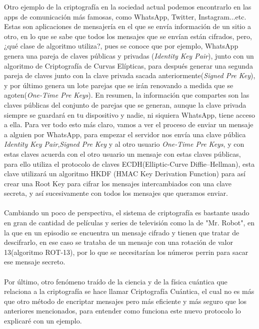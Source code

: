 \documentclass[12pt,a4paper]{book}
\theoremstyle{change}
\begin{document}
	Otro ejemplo de la criptografía en la sociedad actual podemos encontrarlo en las apps de comunicación más famosas, como WhatsApp, Twitter, Instagram...etc. Estas son aplicaciones de mensajería en el que se envía información de un sitio a otro, en lo que se sabe que todos los mensajes que se envían están cifrados, pero, ¿qué clase de algoritmo utiliza?, pues se conoce que por ejemplo, WhatsApp genera una pareja de claves públicas y privadas (\textit{Identity Key Pair}), junto con un algoritmo de Criptografía de Curvas Elípticas, para después generar una segunda pareja de claves junto con la clave privada sacada anteriormente(\textit{Signed Pre Key}), y por último genera un lote parejas que se irán renovando a medida que se agoten(\textit{One-Time Pre Keys}). En resumen, la información que compartes son las claves públicas del conjunto de parejas que se generan, aunque la clave privada siempre se guardará en tu dispositivo y nadie, ni siquiera WhatsApp, tiene acceso a ella. Para ver todo esto más claro, vamos a ver el proceso de enviar un mensaje a alguien por WhatsApp, para empezar el servidor nos envía una clave pública \textit{Identity Key Pair},\textit{Signed Pre Key} y al otro usuario \textit{One-Time Pre Keys}, y con estas claves acuerda con el otro usuario un mensaje con estas claves públicas, para ello utiliza el protocolo de claves ECDH(Elliptic-Curve Diffie–Hellman), esta clave utilizará un algoritmo HKDF (HMAC Key Derivation Function) para así crear una Root Key para cifrar los mensajes intercambiados con una clave secreta, y así sucesivamente con todos los mensajes que queramos enviar.\\
	\vspace{5mm}\\ %
	Cambiando un poco de perspectiva, el sistema de criptografía es bastante usado en gran de cantidad de películas y series de televisión como la de "Mr. Robot", en la que en un episodio se encuentra un mensaje cifrado y tienen que tratar de descifrarlo, en ese caso se trataba de un mensaje con una rotación de valor 13(algoritmo ROT-13), por lo que se necesitarían los números perrin para sacar ese mensaje secreto.\\
	\vspace{5mm}\\ %
	Por último, otro fenómeno traído de la ciencia y de la física cuántica que relaciona a la criptografía se hace llamar Criptografía Cuántica, el cual no es más que otro método de encriptar mensajes pero más eficiente y más seguro que los anteriores mencionados, para entender como funciona este nuevo protocolo lo explicaré con un ejemplo.\\
\end{document}
